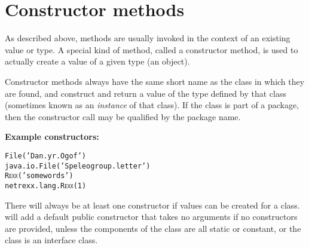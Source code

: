 \section{Constructor methods}\label{refcons}
\index{,}
 
As described above, methods are usually invoked in the context of an
existing value or type.
A special kind of method, called a constructor method, is used to
actually create a value of a given type (an object).
 
Constructor methods always have the same short name as the class in
which they are found, and construct and return a value of the type
defined by that class (sometimes known as an \emph{instance} of that
class).
If the class is part of a package, then the constructor call may be
qualified by the package name.
 
\textbf{Example constructors:}
\begin{alltt}
File('Dan.yr.Ogof')
java.io.File('Speleogroup.letter')
R\textsc{exx}('some words')
netrexx.lang.R\textsc{exx}(1)
\end{alltt}
 
There will always be at least one constructor if values can be created
for a class.  \nr{} will add a default public constructor that takes
no arguments if no constructors are provided, unless the components of
the class are all static or constant, or the class is an interface
class.
 
